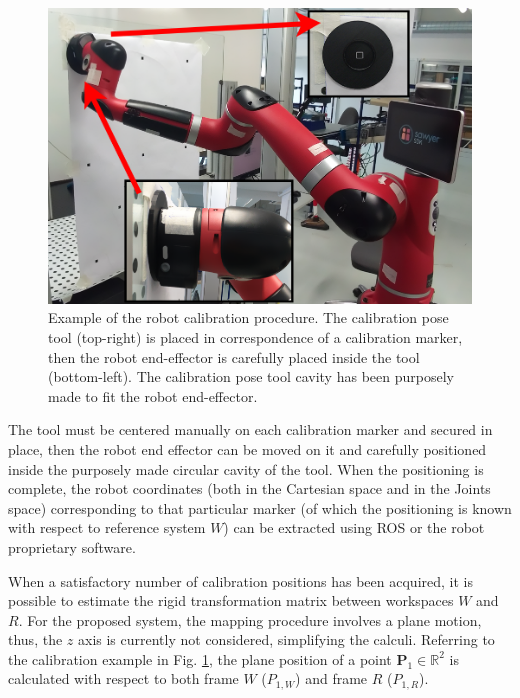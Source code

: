 \documentclass[letterpaper, 10 pt, conference]{ieeeconf}  %
\begin{document}
\begin{figure}[h]
	\centering
	\includegraphics[width=1\columnwidth]{figures/robotcalibration.png}
	\caption{Example of the robot calibration procedure. The calibration pose tool (top-right) is placed in correspondence of a calibration marker, then the robot end-effector is carefully placed inside the tool (bottom-left). The calibration pose tool cavity has been purposely made to fit the robot end-effector.}
	\label{fig:robotcalib}
\end{figure}

The tool must be centered manually on each calibration marker and secured in place, then the robot end effector can be moved on it and carefully positioned inside the purposely made circular cavity of the tool. When the positioning is complete, the robot coordinates (both in the Cartesian space and in the Joints space) corresponding to that particular marker (of which the positioning is known with respect to reference system $W$) can be extracted using ROS or the robot proprietary software. 

When a satisfactory number of calibration positions has been acquired, it is possible to estimate the rigid transformation matrix between workspaces $W$ and $R$.
For the proposed system, the mapping procedure involves a plane motion, thus, the $z$ axis is currently not considered, simplifying the calculi.
Referring to the calibration example in Fig. \ref{fig:robotcalib}, the plane position of a point $\mathbf{P}_1\in\mathbb{R}^2$ is calculated with respect to both frame $W$ ($P_{1,W}$) and frame $R$ ($P_{1,R}$).
\end{document}
